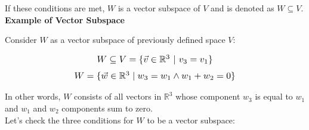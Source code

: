 If these conditions are met, $W$ is a vector subspace of $V$ and is denoted as $W \subseteq V$.
\\

\textbf{Example of Vector Subspace}

Consider \(W\) as a vector subspace of previously defined space \(V\):

$$
\scalebox{1.1}{$W \subseteq V = \{\vec v \in \mathbb{R}^3 \ | \ v_3 = v_1\}$}
$$$$
\scalebox{1.1}{$W = \{ \vec{w} \in \mathbb{R}^3 \mid w_3 = w_1 \land w_1 + w_2 = 0\}$}
$$

In other words, \(W\) consists of all vectors in \(\mathbb{R}^3\) whose component $w_3$ is equal to $w_1$ and $w_1$ and $w_2$ components sum to zero.
\\

Let's check the three conditions for \(W\) to be a vector subspace:

